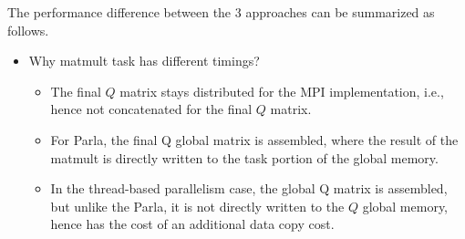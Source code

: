 \documentclass{article}
\begin{document}
The performance difference between the 3 approaches can be summarized as follows. 
\begin{itemize}
    \item Why matmult task has different timings? 
    \begin{itemize}
        \item The final $Q$ matrix stays distributed for the MPI implementation, i.e.,  hence not concatenated for the final $Q$ matrix. 
        \item For Parla, the final Q global matrix is assembled, where the result of the matmult is directly written to the task portion of the global memory.
        \item In the thread-based parallelism case, the global Q matrix is assembled, but unlike the Parla, it is not directly written to the $Q$ global memory, hence has the cost of an additional data copy cost.  
    \end{itemize}
\end{itemize}
\end{document}
